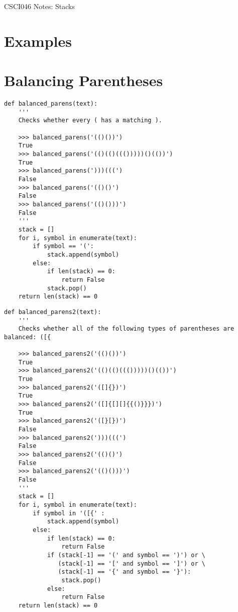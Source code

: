 \documentclass[10pt]{article}
\theoremstyle{definition}
\begin{document}
\begin{center}
    {
\Large
CSCI046 Notes: Stacks
}
\end{center}



\section{Examples}

\newpage
\section{Balancing Parentheses}

\begin{lstlisting}
def balanced_parens(text):
    '''
    Checks whether every ( has a matching ).

    >>> balanced_parens('(()())')
    True
    >>> balanced_parens('(()(()((()))))()(())')
    True
    >>> balanced_parens(')))(((')
    False
    >>> balanced_parens('(()()')
    False
    >>> balanced_parens('(()()))')
    False
    '''
    stack = []
    for i, symbol in enumerate(text):
        if symbol == '(':
            stack.append(symbol)
        else:
            if len(stack) == 0:
                return False
            stack.pop()
    return len(stack) == 0
\end{lstlisting}

\newpage
\begin{lstlisting}
def balanced_parens2(text):
    '''
    Checks whether all of the following types of parentheses are balanced: ([{

    >>> balanced_parens2('(()())')
    True
    >>> balanced_parens2('(()(()((()))))()(())')
    True
    >>> balanced_parens2('([]{})')
    True
    >>> balanced_parens2('([]{[][]{{()}}})')
    True
    >>> balanced_parens2('([}[})')
    False
    >>> balanced_parens2(')))(((')
    False
    >>> balanced_parens2('(()()')
    False
    >>> balanced_parens2('(()()))')
    False
    '''
    stack = []
    for i, symbol in enumerate(text):
        if symbol in '([{' :
            stack.append(symbol)
        else:
            if len(stack) == 0:
                return False
            if (stack[-1] == '(' and symbol == ')') or \
               (stack[-1] == '[' and symbol == ']') or \
               (stack[-1] == '{' and symbol == '}'):
                stack.pop()
            else:
                return False
    return len(stack) == 0
\end{lstlisting}
\end{document}
